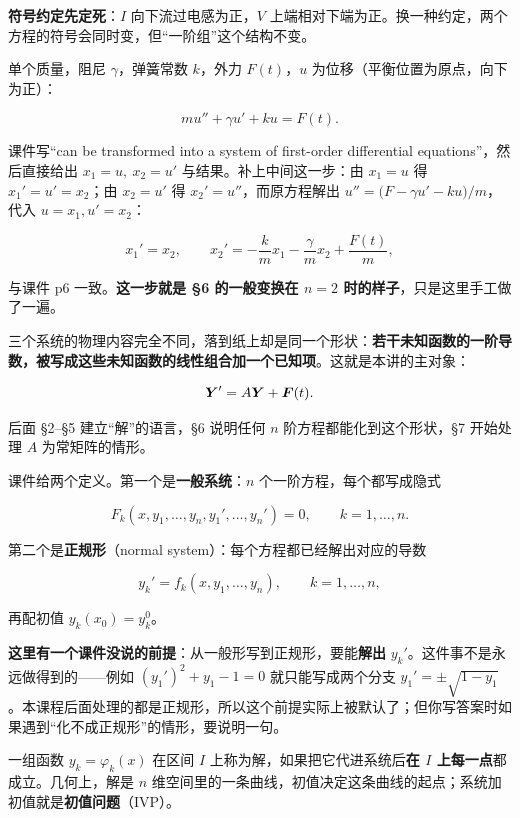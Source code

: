 \documentclass[11pt]{ctexart}
\begin{document}
\textbf{符号约定先定死}：$I$ 向下流过电感为正，$V$ 上端相对下端为正。换一种约定，两个方程的符号会同时变，但“一阶组”这个结构不变。


单个质量，阻尼 $\gamma$，弹簧常数 $k$，外力 $F(t)$，$u$ 为位移（平衡位置为原点，向下为正）：

\[
m u''+\gamma u'+k u=F(t).
\]

课件写“can be transformed into a system of first-order differential equations”，然后直接给出 $x_1=u,\ x_2=u'$ 与结果。补上中间这一步：由 $x_1=u$ 得 $x_1'=u'=x_2$；由 $x_2=u'$ 得 $x_2'=u''$，而原方程解出 $u''=\bigl(F-\gamma u'-ku\bigr)/m$，代入 $u=x_1,u'=x_2$：

\[
x_1'=x_2,\qquad
x_2'=-\frac{k}{m}x_1-\frac{\gamma}{m}x_2+\frac{F(t)}{m},
\]

与课件 p6 一致。\textbf{这一步就是 §6 的一般变换在 $n=2$ 时的样子}，只是这里手工做了一遍。


三个系统的物理内容完全不同，落到纸上却是同一个形状：\textbf{若干未知函数的一阶导数，被写成这些未知函数的线性组合加一个已知项}。这就是本讲的主对象：

\[
\boldsymbol{Y}'=A\boldsymbol{Y}+\boldsymbol{F}(t).
\]

后面 §2--§5 建立“解”的语言，§6 说明任何 $n$ 阶方程都能化到这个形状，§7 开始处理 $A$ 为常矩阵的情形。



课件给两个定义。第一个是\textbf{一般系统}：$n$ 个一阶方程，每个都写成隐式

\[
F_k(x,y_1,\dots,y_n,y_1',\dots,y_n')=0,\qquad k=1,\dots,n .
\]

第二个是\textbf{正规形}（normal system）：每个方程都已经解出对应的导数

\[
y_k'=f_k(x,y_1,\dots,y_n),\qquad k=1,\dots,n ,
\]

再配初值 $y_k(x_0)=y_k^0$。

\textbf{这里有一个课件没说的前提}：从一般形写到正规形，要能\textbf{解出} $y_k'$。这件事不是永远做得到的——例如 $(y_1')^2+y_1-1=0$ 就只能写成两个分支 $y_1'=\pm\sqrt{1-y_1}$。本课程后面处理的都是正规形，所以这个前提实际上被默认了；但你写答案时如果遇到“化不成正规形”的情形，要说明一句。


一组函数 $y_k=\varphi_k(x)$ 在区间 $I$ 上称为解，如果把它代进系统后\textbf{在 $I$ 上每一点}都成立。几何上，解是 $n$ 维空间里的一条曲线，初值决定这条曲线的起点；系统加初值就是\textbf{初值问题}（IVP）。
\end{document}
